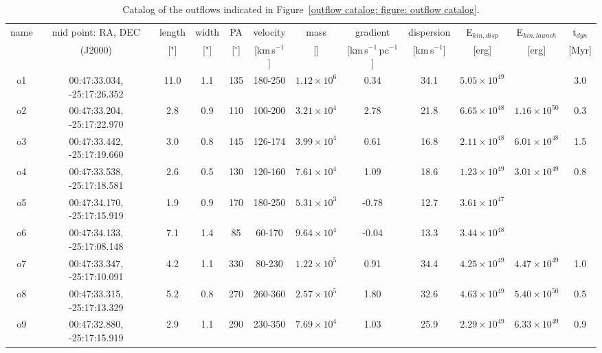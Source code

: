 \begin{table}
	\centering
    \begin{threeparttable}
	    \caption[Catalog of outflow features]{Catalog of the outflows indicated in Figure~\ref{outflow catalog: figure: outflow catalog}.
	        \label{outflow catalog: table: outflow catalog}}
    \begin{tabular}{cccccccccccc}
        \toprule
        \multirow{2}{*}{name} & mid point: RA, DEC & length\tnote{a} & width\tnote{a} & PA\tnote{b} & velocity\tnote{c} & mass\tnote{d} & gradient\tnote{e} & dispersion\tnote{f} & E$_{kin,disp}$\tnote{g} & E$_{kin,launch}$\tnote{h} & t$_{dyn}$\tnote{i}\\
		& (J2000) & ["] & ["] & [$^\circ$] & [km\,s$^{-1}$] & [\Msun] & [km\,s$^{-1}$\,pc$^{-1}$] & [km\,s$^{-1}$] & [erg] & [erg] & [Myr]\\
        \midrule
    	o1  & 00:47:33.034, -25:17:26.352 & 11.0 & 1.1 & 135 & 180-250 & $1.12 \times 10^6$ & 0.34  & 34.1 & $5.05 \times 10^{49}$ & & 3.0\\
	    o2  & 00:47:33.204, -25:17:22.970 & 2.8  & 0.9 & 110 & 100-200 & $3.21 \times 10^4$ & 2.78  & 21.8 & $6.65 \times 10^{48}$ & $1.16 \times 10^{50}$ & 0.3\\
	    o3  & 00:47:33.442, -25:17:19.660 & 3.0  & 0.8 & 145 & 126-174 & $3.99 \times 10^4$ & 0.61  & 16.8 & $2.11 \times 10^{48}$ & $6.01 \times 10^{48}$ & 1.5\\
	    o4  & 00:47:33.538, -25:17:18.581 & 2.6  & 0.5 & 130 & 120-160 & $7.61 \times 10^4$ & 1.09  & 18.6 & $1.23 \times 10^{49}$ & $3.01 \times 10^{49}$ & 0.8\\
	    o5  & 00:47:34.170, -25:17:15.919 & 1.9  & 0.9 & 170 & 180-250 & $5.31 \times 10^3$ & -0.78 & 12.7 & $3.61 \times 10^{47}$ & & \\
	    o6  & 00:47:34.133, -25:17:08.148 & 7.1  & 1.4 & 85  & 60-170  & $9.64 \times 10^4$ & -0.04 & 13.3 & $3.44 \times 10^{48}$ & & \\
	    o7  & 00:47:33.347, -25:17:10.091 & 4.2  & 1.1 & 330 & 80-230  & $1.22 \times 10^5$ & 0.91  & 34.4 & $4.25 \times 10^{49}$ & $4.47 \times 10^{49}$ & 1.0\\
	    o8  & 00:47:33.315, -25:17:13.329 & 5.2  & 0.8 & 270 & 260-360 & $2.57 \times 10^5$ & 1.80  & 32.6 & $4.63 \times 10^{49}$ & $5.40 \times 10^{50}$ & 0.5\\
	    o9  & 00:47:32.880, -25:17:15.919 & 2.9  & 1.1 & 290 & 230-350 & $7.69 \times 10^4$ & 1.03  & 25.9 & $2.29 \times 10^{49}$ & $6.33 \times 10^{49}$ & 0.9\\

\end{tabular}
\end{threeparttable}
\end{table}
